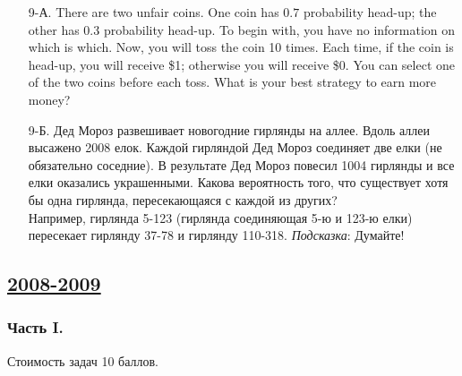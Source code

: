 \begin{enumerate}
\item[9-А.] There are two unfair coins. One coin has $0.7$ probability head-up;
the other has $0.3$ probability head-up. To begin with, you have no information
on which is which. Now, you will toss the coin 10 times. Each time, if the coin is
head-up, you will receive \$1; otherwise you will receive \$0. You can select one
of the two coins before each toss. What is your best strategy to earn more money?
\item[9-Б.] Дед Мороз развешивает новогодние гирлянды на аллее. Вдоль аллеи высажено
2008 елок. Каждой гирляндой Дед Мороз соединяет две елки (не обязательно соседние).
В результате Дед Мороз повесил 1004 гирлянды и все елки оказались украшенными.
Какова вероятность того, что существует хотя бы одна гирлянда, пересекающаяся с
каждой из других? \\
Например, гирлянда 5-123 (гирлянда соединяющая 5-ю и 123-ю елки) пересекает гирлянду
37-78 и гирлянду 110-318.
\emph{Подсказка}: Думайте!
\end{enumerate}



\newpage
\subsection[2008-2009]{\hyperref[sec:sol_kr_02_2008_2009]{2008-2009}}
\label{sec:kr_02_2008_2009}

\subsubsection*{Часть I.}

Стоимость задач 10 баллов.

